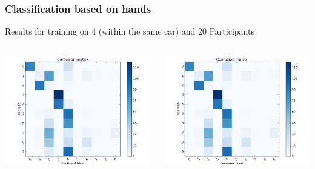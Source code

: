 \documentclass{beamer}
\begin{document}
	\begin{frame}
		\frametitle{Classification based on hands}
		Results for training on 4 (within the same car) and 20 Participants
		\begin{columns}
			\begin{column}{0.5\textwidth}
				\begin{center}
					\includegraphics[width=\textwidth]{handpose_plot_4p_c9}\\			
				\end{center}
			\end{column}
			\begin{column}{0.5\textwidth}
				\begin{center}
					\includegraphics[width=\textwidth]{handpose_plot_4p_c9}
				\end{center}
			\end{column}
		\end{columns}		
	\end{frame}	
	
\end{document}
